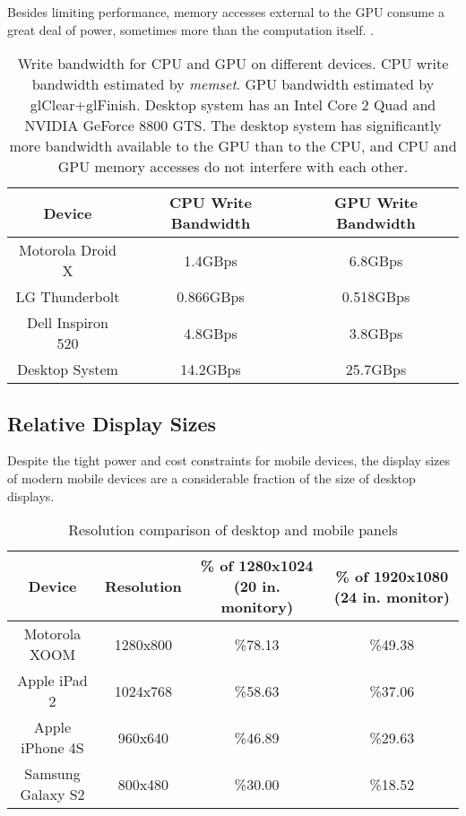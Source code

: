 Besides limiting performance, memory accesses external to the GPU consume a
great deal of power, sometimes more than the computation itself.
\cite{Antochi04}.

\begin{table}[htb]\centering \begin{tabular}{|c|c|c|} 
\hline \small{Device} & \small{CPU Write Bandwidth} & \small{GPU Write Bandwidth}   \\ \hline 
\hline \small{Motorola Droid X} & \small{1.4GBps} & \small{6.8GBps} \\ 
\hline \small{LG Thunderbolt} & \small{0.866GBps} & \small{0.518GBps} \\ 
\hline \small{Dell Inspiron 520} & \small{4.8GBps} & \small{3.8GBps} \\ 
\hline \small{Desktop System} & \small{14.2GBps} & \small{25.7GBps}\\
\hline
\end{tabular} 
\caption{Write bandwidth for CPU and GPU on different devices.  CPU write bandwidth estimated by \textit{memset}.  GPU bandwidth estimated by glClear+glFinish.  Desktop system has an Intel Core 2 Quad and NVIDIA GeForce 8800 GTS.  The desktop system has significantly more bandwidth available to the GPU than to the CPU, and CPU and GPU memory accesses do not interfere with each other.}
\label{JonMcCaffrey:bandwidth} \end{table}

\subsection{Relative Display Sizes}\label{Jon-McCaffrey:relative-display-sizes}

 

Despite the tight power and cost constraints for mobile devices, the display
sizes of modern mobile devices are a considerable fraction of the size of
desktop displays.

\begin{table}[htb]\centering \begin{tabular}{|c|c|c|c|} 
\hline \small{Device} & \small{Resolution} & \small{\% of 1280x1024 (20 in. monitory)} & \small{\% of 1920x1080 (24 in. monitor)}  \\ \hline 
\small{Motorola XOOM} & \small{1280x800} & \small{\%78.13} & \small{\%49.38}\\ 
\hline \small{Apple iPad 2} & \small{1024x768} & \small{\%58.63} & \small{\%37.06}\\ 
\hline \small{Apple iPhone 4S} & \small{960x640} & \small{\%46.89} & \small{\%29.63}\\
\hline \small{Samsung Galaxy S2} & \small{800x480} & \small{\%30.00} & \small{\%18.52}\\ \hline
\end{tabular} 
\caption{Resolution comparison of desktop and mobile panels} 
\label{JonMcCaffrey:resolutions} \end{table}


